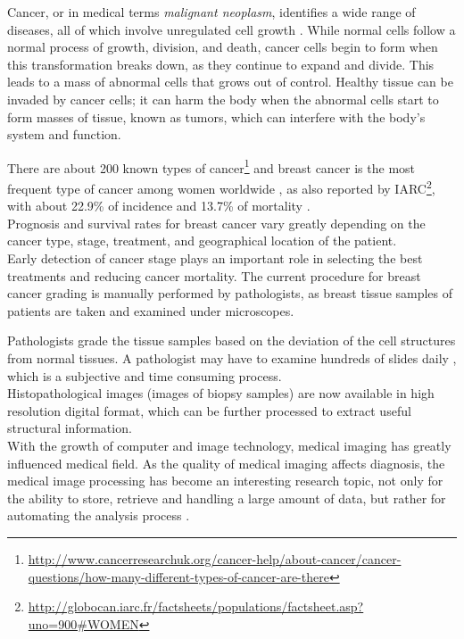 Cancer, or in medical terms \textit{malignant neoplasm}, identifies a wide range of diseases, all of which involve unregulated cell growth \cite{rubin1998genetic}.
While normal cells follow a normal process of growth, division, and death, cancer cells begin to form when this transformation breaks down, as they continue to
expand and divide. This leads to a mass of abnormal cells that grows out of control.
Healthy tissue can be invaded by cancer cells; it can harm the body when the
abnormal cells start to form masses of tissue, known as tumors, which
can interfere with the body's system and function.\\

\clearpage

There are about 200 known types of cancer\footnote{\url{http://www.cancerresearchuk.org/cancer-help/about-cancer/cancer-
questions/how-many-different-types-of-cancer-are-there}} and breast cancer is the most frequent type of cancer among women
worldwide \cite{sariego2010breast}, as also reported by \Gls{IARC}\footnote{\url{http://globocan.iarc.fr/factsheets/populations/factsheet.asp?uno=900#WOMEN}}, with about 22.9\% of
incidence and 13.7\% of mortality \cite{breastCancerIncidence}.\\
Prognosis and survival rates for breast cancer vary greatly depending on the cancer type, stage, treatment, and geographical location of the patient.\\
Early detection of cancer stage plays an important role in selecting the best treatments and reducing cancer mortality.
The current procedure for breast cancer grading is manually performed by pathologists, as
breast tissue samples of patients are taken and examined under microscopes.\\

\vspace{0.5cm}

Pathologists grade the tissue samples based on the deviation of the cell structures
from normal tissues. A pathologist may have to examine hundreds of slides daily \cite{histopat01}, which is a subjective and time consuming process.\\
Histopathological images (images of biopsy samples) are now available in high resolution digital format, which can be further
processed to extract useful structural information.\\
With the growth of computer and image technology, medical imaging has greatly influenced
medical field. As the quality of medical imaging affects diagnosis, the medical
image processing has become an interesting research topic, not only for the ability to store, retrieve and handling a large amount of data, but rather for 
automating the analysis process \cite{medImagingReview01}.\\

